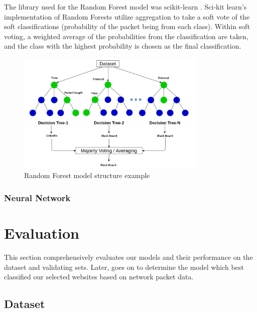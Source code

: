 \documentclass[10pt,sigconf,letterpaper,nonacm]{acmart}
\begin{document}
The library used for the Random Forest model was scikit-learn \cite{scikit-learn}. Sci-kit learn's implementation of Random Forests utilize aggregation to take a soft vote of the soft classifications (probability of the packet being from each class). Within soft voting, a weighted average of the probabilities from the classification are taken, and the class with the highest probability is chosen as the final classification.

\begin{figure}[h!]
  \centering
  \includegraphics[width=9cm]{Figures_and_Graphs/RandomForestExample.png}
  \caption{Random Forest model structure example}
  \label{fig:RFExample}
\end{figure}

\subsubsection{Neural Network}
\section{Evaluation}
This section comprehensively evaluates our models and their performance on the dataset and validating sets. Later, goes on to determine the model which best classified our selected websites based on network packet data.
\subsection{Dataset}
\end{document}
